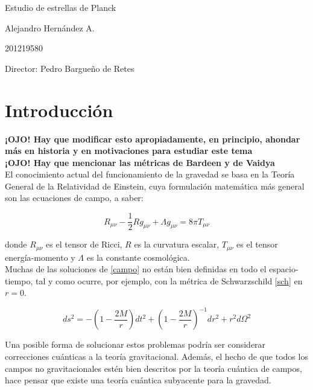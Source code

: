 \documentclass[prb,aps,preprintnumbers,amsmath,amssymb]{article}
\numberwithin{equation}{section}
\begin{document}
\begin{center}
\Huge
Estudio de estrellas de Planck 

\vspace{3mm}
\Large Alejandro Hernández A.

\large
201219580


\vspace{2mm}
\Large
Director: Pedro Bargueño de Retes

\normalsize
\vspace{2mm}

\date{}
\end{center}


\normalsize
\section{Introducción}

\textbf{¡OJO! Hay que modificar esto apropiadamente, en principio, ahondar más en historia y en motivaciones para estudiar este tema}\\

\textbf{¡OJO! Hay que mencionar las métricas de Bardeen y de Vaidya}\\

El conocimiento actual del funcionamiento de la gravedad se basa en la Teoría General de la Relatividad de Einstein, cuya formulación matemática más general son las ecuaciones de campo, a saber:

\begin{equation}
\label{field equations}
R_{\mu \nu} - \frac{1}{2} R g_{\mu \nu} + \Lambda g_{\mu \nu} = 8 \pi T_{\mu \nu}
\end{equation}

donde $R_{\mu \nu}$ es el tensor de Ricci, $R$ es la curvatura escalar, $T_{\mu \nu}$ es el tensor energía-momento y $\Lambda$ es la constante cosmológica.\\

Muchas de las soluciones de \eqref{campo} no están bien definidas en todo el espacio-tiempo, tal y como ocurre, por ejemplo, con la métrica de Schwarzschild \eqref{sch}  en $r = 0$.

\begin{equation}
\label{sch}
ds^2 = -\left( 1 - \frac{2M}{r} \right) dt^2 + \left( 1 - \frac{2M}{r} \right)^{-1} dr^2 + r^2d\Omega ^2
\end{equation}

Una posible forma de solucionar estos problemas podría ser considerar correcciones cuánticas a la teoría gravitacional. Además, el hecho de que todos los campos no gravitacionales estén bien descritos por la teoría cuántica de campos, hace pensar que existe una teoría cuántica subyacente para la gravedad.\\ 
\end{document}
